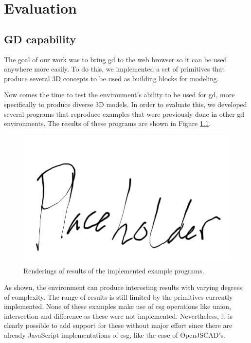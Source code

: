 
\chapter{Evaluation}
\label{chapter:evaluation}




\section{GD capability}
The goal of our work was to bring \gls{gd} to the web browser so it can be used anywhere more easily.
To do this, we implemented a set of primitives that produce several 3D concepts to be used as building blocks for modeling.

Now comes the time to test the environment's ability to be used for \gls{gd}, more specifically to produce diverse 3D models.
In order to evaluate this, we developed several programs that reproduce examples that were previously done in other \gls{gd} environments.
The results of these programs are shown in Figure \ref{fig:all:examples}.

\begin{figure}
  \centering
  \includegraphics[width=12cm]{./images/all_examples}
  \caption{Renderings of results of the implemented example programs.}
  \label{fig:all:examples}
\end{figure}

As shown, the environment can produce interesting results with varying degrees of complexity.
The range of results is still limited by the primitives currently implemented.
None of these examples make use of \gls{csg} operations like union, intersection and difference as these were not implemented.
Nevertheless, it is clearly possible to add support for these without major effort since there are already JavaScript implementations of \gls{csg}, like the case of OpenJSCAD's.


